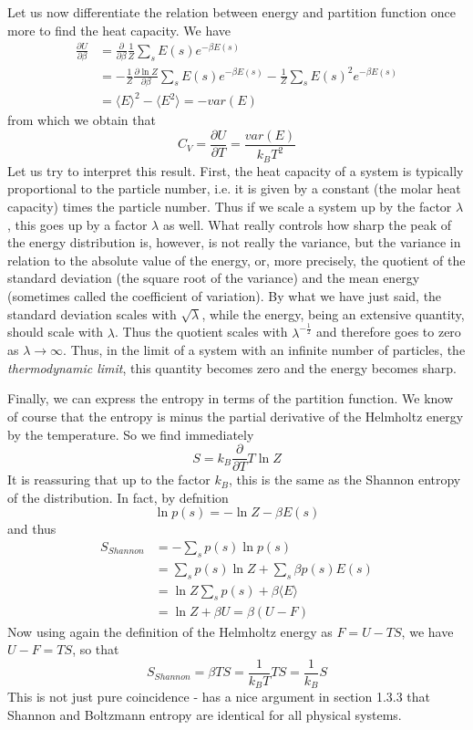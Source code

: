 \documentclass[a4paper, draft]{article}
\theoremstyle{own}
\theoremstyle{remark}
\begin{document}
Let us now differentiate the relation between energy and partition function once more to find the heat capacity. We have
\begin{align*}
\frac{\partial U}{\partial \beta} &= \frac{\partial }{\partial \beta} \frac{1}{Z} \sum_s E(s) e^{-\beta E(s)} \\
&= - \frac{1}{Z} \frac{\partial \ln Z}{\partial \beta} \sum_s E(s) e^{-\beta E(s)}
- \frac{1}{Z} \sum_s E(s)^2 e^{-\beta E(s)} \\
&= \langle E \rangle^2 - \langle E^2 \rangle = - var(E)
\end{align*}
from which we obtain that
$$
C_V = \frac{\partial U}{\partial T} = \frac{var(E)}{k_B T^2}
$$
Let us try to interpret this result. First, the heat capacity of a system is typically proportional to the particle number, i.e. it is given by a constant (the molar heat capacity) times the particle number. Thus if we scale a system up by the factor $\lambda$, this goes up by a factor $\lambda$ as well. What really controls how sharp the peak of the energy distribution is, however, is not really the variance, but the variance in relation to the absolute value of the energy, or, more precisely, the quotient of the standard deviation (the square root of the variance) and the mean energy (sometimes called the coefficient of variation). By what we have just said, the standard deviation scales with $\sqrt{\lambda}$, while the energy, being an extensive quantity, should scale with $\lambda$. Thus the quotient scales with $\lambda^{-\frac{1}{2}}$ and therefore goes to zero as $\lambda \rightarrow \infty$. Thus, in the limit of a system with an infinite number of particles, the {\em thermodynamic limit}, this quantity becomes zero and the energy becomes sharp.

Finally, we can express the entropy in terms of the partition function. We know of course that the entropy is minus the partial derivative of the Helmholtz energy by the temperature. So we find immediately
$$
S = k_B \frac{\partial}{\partial T} T \ln Z
$$
It is reassuring that up to the factor $k_B$, this is the same as the Shannon entropy of the distribution. In fact, by defnition 
$$
\ln p(s) = - \ln Z - \beta E(s)
$$
and thus
\begin{align*}
S_{Shannon} &= - \sum_s p(s) \ln p(s) \\
&= \sum_s p(s) \ln Z + \sum_s \beta p(s) E(s)  \\
&= \ln Z \sum_s p(s) + \beta \langle E \rangle \\
&= \ln Z + \beta U=  \beta (U - F)
\end{align*}
Now using again the definition of the Helmholtz energy as $F = U - TS$, we have $U - F = TS$, so that
$$
S_{Shannon} = \beta TS = \frac{1}{k_B T} {TS} = \frac{1}{k_B} {S}
$$
This is not just pure coincidence - \cite{Tong} has a nice argument in section 1.3.3 that Shannon and Boltzmann entropy are identical for all physical systems. 
\end{document}
